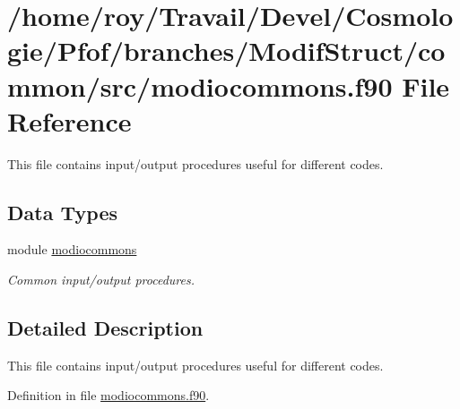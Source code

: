 \hypertarget{modiocommons_8f90}{\section{/home/roy/\-Travail/\-Devel/\-Cosmologie/\-Pfof/branches/\-Modif\-Struct/common/src/modiocommons.f90 File Reference}
\label{modiocommons_8f90}
}


This file contains input/output procedures useful for different codes.  


\subsection*{Data Types}
\begin{DoxyCompactItemize}
\item 
module \hyperlink{classmodiocommons}{modiocommons}
\begin{DoxyCompactList}\small\item\em Common input/output procedures. \end{DoxyCompactList}\end{DoxyCompactItemize}


\subsection{Detailed Description}
This file contains input/output procedures useful for different codes. 

Definition in file \hyperlink{modiocommons_8f90_source}{modiocommons.\-f90}.

